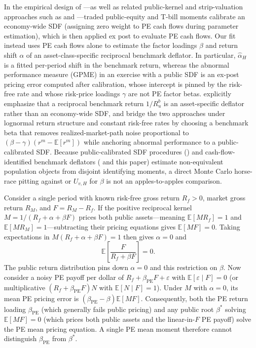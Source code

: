 In the empirical design of \citet{KN16}---as well as related public-kernel and strip-valuation approaches such as \citet{GSW20} and \citet{GN18}---traded public-equity and T-bill moments calibrate an economy-wide SDF (assigning zero weight to PE cash flows during parameter estimation), which is then applied ex post to evaluate PE cash flows. Our fit instead uses PE cash flows alone to estimate the factor loadings $\beta$ and return shift $\alpha$ of an asset-class-specific reciprocal benchmark deflator. In particular, $\hat\alpha_H$ is a fitted per-period shift in the benchmark return, whereas the abnormal performance measure (GPME) in an exercise with a public SDF is an ex-post pricing error computed after calibration, whose intercept is pinned by the risk-free rate and whose risk-price loadings $\gamma$ are not PE factor betas. \citet{KN24} explicitly emphasize that a reciprocal benchmark return $1/R_u^b$ is an asset-specific deflator rather than an economy-wide SDF, and bridge the two approaches under lognormal return structure and constant risk-free rates by choosing a benchmark beta that removes realized-market-path noise proportional to $(\beta - \gamma)(r^m - \mathbb E[r^m])$ while anchoring abnormal performance to a public-calibrated SDF. Because public-calibrated SDF procedures (\citealp{KN16}) and cash-flow-identified benchmark deflators (\citealp{DLP12} and this paper) estimate non-equivalent population objects from disjoint identifying moments, a direct Monte Carlo horse-race pitting \citet{KN16} against \citet{DLP12} or $U_{v,H}$ for $\beta$ is not an apples-to-apples comparison.

Consider a single period with known risk-free gross return $R_f>0$, market gross return $R_M$, and $F=R_M-R_f$. If the positive reciprocal kernel $M=1/(R_f+\alpha+\beta F)$ prices both public assets---meaning $\mathbb E[MR_f]=1$ and $\mathbb E[MR_M]=1$---subtracting their pricing equations gives $\mathbb E[MF]=0$. Taking expectations in $M(R_f+\alpha+\beta F)=1$ then gives $\alpha=0$ and
\[
 \mathbb E\!\left[\frac{F}{R_f+\beta F}\right]=0.
\]
The public return distribution pins down $\alpha=0$ and this restriction on $\beta$. Now consider a noisy PE payoff per dollar of $R_f+\beta_{\mathrm{PE}}F+\varepsilon$ with $\mathbb E[\varepsilon\mid F]=0$ (or multiplicative $(R_f+\beta_{\mathrm{PE}}F)N$ with $\mathbb E[N\mid F]=1$). Under $M$ with $\alpha=0$, its mean PE pricing error is $(\beta_{\mathrm{PE}}-\beta)\mathbb E[MF]$. Consequently, both the PE return loading $\beta_{\mathrm{PE}}$ (which generally fails public pricing) and any public root $\beta^\ast$ solving $\mathbb E[MF]=0$ (which prices both public assets and the linear-in-$F$ PE payoff) solve the PE mean pricing equation. A single PE mean moment therefore cannot distinguish $\beta_{\mathrm{PE}}$ from $\beta^\ast$.

